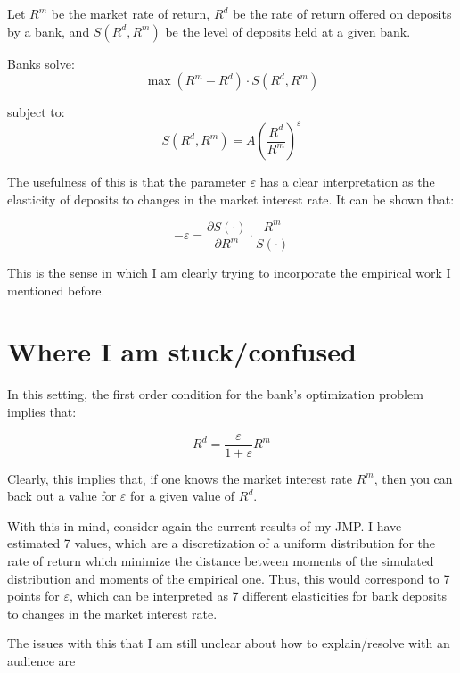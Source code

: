 \documentclass{article}
\begin{document}
 \par Let $R^m$ be the market rate of return, $R^d$ be the rate of return offered on deposits by a  bank, and $S(R^d, R^m)$ be the level of deposits held at a given bank.

\par Banks solve:
\[
\max (R^m - R^d) \cdot S(R^d, R^m)
\]

\par subject to:
\[
S(R^d, R^m) = A \left( \frac{R^d}{R^m} \right)^{\varepsilon}
\]

\par The usefulness of this is that the parameter $\varepsilon$ has a clear interpretation as the elasticity of deposits to changes in the market interest rate. It can be shown that:

\[
-\varepsilon = \frac{\partial S(\cdot)}{\partial R^m} \cdot \frac{R^m}{S(\cdot)}
\]

\par This is the sense in which I am clearly trying to incorporate the empirical work I mentioned before.

\section{Where I am stuck/confused}

\par In this setting, the first order condition for the bank's optimization problem implies that:

\[
R^d  = \frac{\varepsilon}{1+ \varepsilon} R^m 
\]

\par Clearly, this implies that, if one knows the market interest rate $R^m$, then you can back out a value for $\varepsilon$ for a given value of $R^d$.

\par With this in mind, consider again the current results of my JMP. I have estimated 7 values, which are a discretization of a uniform distribution for the rate of return which minimize the distance between moments of the simulated distribution and moments of the empirical one. Thus, this would correspond to 7 points for $\varepsilon$, which can be interpreted as 7 different elasticities for bank deposits to changes in the market interest rate.

\par The issues with this that I am still unclear about how to explain/resolve with an audience are
\end{document}
